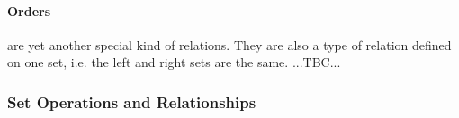
\paragraph{Orders} are yet another special kind of relations. They are also a type of relation defined on one set, i.e. the left and right sets are the same. ...TBC...

\subsubsection{Set Operations and Relationships}

